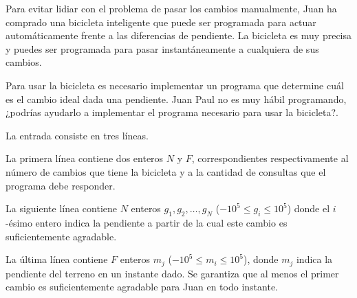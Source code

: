 \documentclass{oci}
\begin{document}
\begin{problemDescription}
Para evitar lidiar con el problema de pasar los cambios manualmente, Juan ha
comprado una bicicleta inteligente que puede ser programada para actuar
automáticamente frente a las diferencias de pendiente.
La bicicleta es muy precisa y puedes ser programada para pasar instantáneamente
a cualquiera de sus cambios.

Para usar la bicicleta es necesario implementar un programa que determine cuál
es el cambio ideal dada una pendiente.
Juan Paul no es muy hábil programando, ¿podrías ayudarlo a implementar el
programa necesario para usar la bicicleta?.

\end{problemDescription}

\begin{inputDescription}
La entrada consiste en tres líneas.

La primera línea contiene dos enteros $N$ y $F$, correspondientes
respectivamente al número de cambios que tiene la bicicleta y a la cantidad
de consultas que el programa debe responder.

La siguiente línea contiene $N$ enteros $g_1,g_2,\ldots, g_N$ ($-10^5\leq
g_i\leq 10^5$) donde el $i$-ésimo entero indica la pendiente a partir de la cual
este cambio es suficientemente agradable.

La última línea contiene $F$ enteros $m_j$ ($-10^5\leq m_i\leq 10^5$), donde
$m_j$ indica la pendiente del terreno en un instante dado.
Se garantiza que al menos el primer cambio es suficientemente agradable para
Juan en todo instante.
\end{inputDescription}
\end{document}
